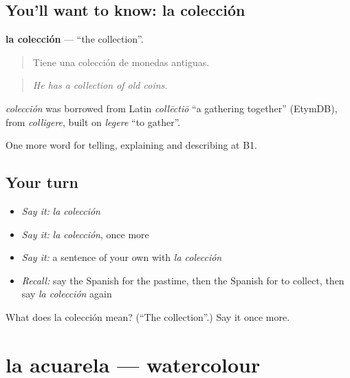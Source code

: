 \subsection*{You'll want to know: la colección}
\textbf{la colección} — \textquotedblleft{}the collection\textquotedblright{}.

\begin{quote}
Tiene una colección de monedas antiguas.
\end{quote}

\begin{quote}
\emph{He has a collection of old coins.}
\end{quote}

\begin{cousinweb}
\emph{colección} was borrowed from Latin \emph{collēctiō} \textquotedblleft{}a gathering together\textquotedblright{} (EtymDB), from \emph{colligere}, built on \emph{legere} \textquotedblleft{}to gather\textquotedblright{}.
\end{cousinweb}

\begin{grammarlens}[title={What you've built}]
One more word for telling, explaining and describing at B1.
\end{grammarlens}

\subsection*{Your turn}
\begin{itemize}
\raggedright
  \item \emph{Say it:} \emph{la colección}
  \item \emph{Say it:} \emph{la colección}, once more
  \item \emph{Say it:} a sentence of your own with \emph{la colección}
  \item \emph{Recall:} say the Spanish for the pastime, then the Spanish for to collect, then say \emph{la colección} again
\end{itemize}

\begin{tcolorbox}[breakable,colback=teal!4,colframe=teal!35!black,title={Before you move on}]
What does la colección mean? (\textquotedblleft{}The collection\textquotedblright{}.) Say it once more.
\end{tcolorbox}
\section[la acuarela]{la acuarela — watercolour}

